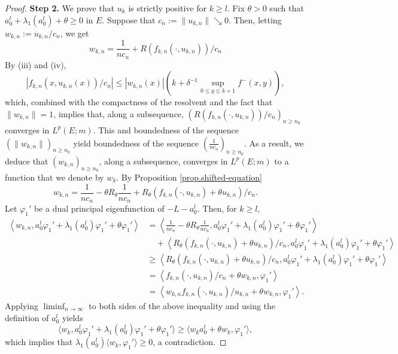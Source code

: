 \documentclass[11pt,a4paper,reqno]{amsart}
\theoremstyle{definition}
\numberwithin{equation}{section}
\begin{document}
\begin{proof}
{\bf Step 2.} We  prove that $u_k$ is strictly positive for $k\ge l$. 
Fix  $\theta>0$
such that $a^l_0+\lambda_1(a_0^l)+\theta\ge 0$ in $E$.
Suppose that $c_n:=\|u_{k,n}\|\searrow 0$.
Then, letting $w_{k,n}:= u_{k,n}/c_n$, we get
\[
w_{k,n}=\frac{1}{nc_n}+R(f_{k,n}(\cdot,u_{k,n}))/c_n
\]
By (iii) and (iv),
\[
|f_{k,n}(x,u_{k,n}(x))/c_n|\le |w_{k,n}(x)|(k+\delta^{-1}\sup_{0\le y\le k+1}f^-(x,y)),
\]
which, combined with the compactness of the resolvent  and the fact that $\|w_{k,n}\|=1$,
implies that, along a  subsequence, $(R(f_{k,n}(\cdot,u_{k,n}))/c_n)_{n\ge n_0}$ converges in $L^p(E;m)$.
This and boundedness of the sequence $(\|w_{k,n}\|)_{n\ge n_0}$ yield boundedness of the sequence 
$(\frac{1}{nc_n})_{n\ge n_0}$.
As a result, 
we deduce that $(w_{k,n})_{n\ge n_0}$, along a  subsequence, converges in $L^p(E;m)$
to a function that we denote by $w_k$.  By Proposition \ref{prop.shifted-equation} 
\[
w_{k,n}=\frac{1}{nc_n}-\theta R_\theta\frac{1}{nc_n} +R_\theta(f_{k,n}(\cdot,u_{k,n})+\theta u_{k,n})/c_n.
\]
Let $\varphi_1'$ be a dual principal eigenfunction of $-L-a_0^l$. Then, for $k\ge l$,
\[
\begin{split}
\left\langle w_{k,n},a_0^l\varphi_1'+\lambda_1(a_0^l)\varphi_1'+\theta\varphi_1'\right\rangle&
=\left\langle \frac{1}{nc_n}-\theta R_\theta\frac{1}{nc_n}, a_0^l\varphi_1'+\lambda_1(a_0^l)\varphi_1'
+\theta\varphi_1'\right\rangle \\&\quad
+\left\langle R_\theta(f_{k,n}(\cdot,u_{k,n})+\theta u_{k,n})/c_n, a_0^l\varphi_1'
+\lambda_1(a_0^l)\varphi_1'+\theta \varphi_1'\right\rangle 
\\&\ge \left\langle R_\theta(f_{k,n}(\cdot,u_{k,n})+\theta u_{k,n})/c_n, a_0^l\varphi_1'+\lambda_1(a_0^l)\varphi_1'
+\theta \varphi_1'\right\rangle\\&
=\left\langle f_{k,n}(\cdot,u_{k,n})/c_n+\theta w_{k,n}, \varphi_1'\right\rangle \\&=
\left\langle w_{k,n}f_{k,n}(\cdot,u_{k,n})/u_{k,n}+\theta w_{k,n}, \varphi_1'\right\rangle.
\end{split}
\]
Applying $\liminf_{n\to \infty}$ to both  sides of the above inequality and using the definition of $a_0^l$ yields
\[
\langle w_{k},a_0^l\varphi_1'+\lambda_1(a_0^l)\varphi_1'
+\theta \varphi_1'\rangle\ge \langle w_{k}a_0^l+\theta w_k, \varphi_1'\rangle,
\]
which implies that $\lambda_1(a_0^l) \langle w_{k},\varphi_1'\rangle\ge0$, a contradiction.


\end{proof}
\end{document}

